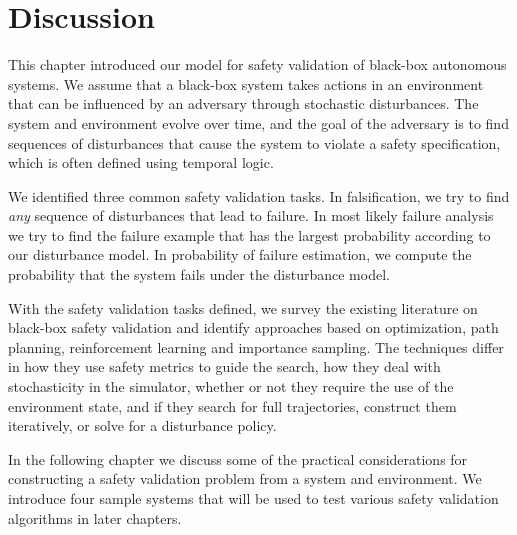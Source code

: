 \section{Discussion}
This chapter introduced our model for safety validation of black-box autonomous systems. We assume that a black-box system takes actions in an environment that can be influenced by an adversary through stochastic disturbances. The system and environment evolve over time, and the goal of the adversary is to find sequences of disturbances that cause the system to violate a safety specification, which is often defined using temporal logic.

We identified three common safety validation tasks. In falsification, we try to find \emph{any} sequence of disturbances that lead to failure. In most likely failure analysis we try to find the failure example that has the largest probability according to our disturbance model. In probability of failure estimation, we compute the probability that the system fails under the disturbance model. 

With the safety validation tasks defined, we survey the existing literature on black-box safety validation and identify approaches based on optimization, path planning, reinforcement learning and importance sampling. The techniques differ in how they use safety metrics to guide the search, how they deal with stochasticity in the simulator, whether or not they require the use of the environment state, and if they search for full trajectories, construct them iteratively, or solve for a disturbance policy. 

In the following chapter we discuss some of the practical considerations for constructing a safety validation problem from a system and environment. We introduce four sample systems that will be used to test various safety validation algorithms in later chapters. 